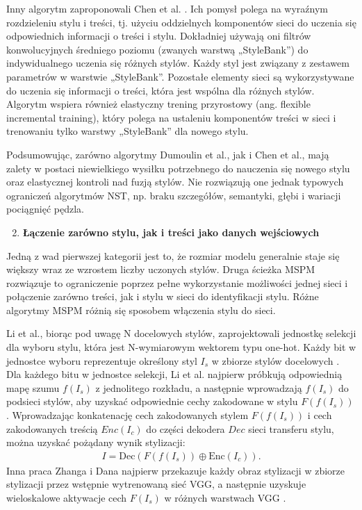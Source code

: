 \documentclass[12pt]{article}
\begin{document}
Inny algorytm zaproponowali Chen et al. \cite{44}. Ich pomysł polega na wyraźnym rozdzieleniu stylu i treści, tj. użyciu oddzielnych komponentów sieci do uczenia się odpowiednich informacji o treści i stylu. Dokładniej używają oni filtrów konwolucyjnych średniego poziomu (zwanych warstwą „StyleBank”) do indywidualnego uczenia się różnych stylów. Każdy styl jest związany z zestawem parametrów w warstwie „StyleBank”. Pozostałe elementy sieci są wykorzystywane do uczenia się informacji o treści, która jest wspólna dla różnych stylów. Algorytm wspiera również elastyczny trening przyrostowy (ang. flexible incremental training), który polega na ustaleniu komponentów treści w sieci i trenowaniu tylko warstwy „StyleBank” dla nowego stylu.

Podsumowując, zarówno algorytmy Dumoulin et al., jak i Chen et al., mają zalety w postaci niewielkiego wysiłku potrzebnego do nauczenia się nowego stylu oraz elastycznej kontroli nad fuzją stylów. Nie rozwiązują one jednak typowych ograniczeń algorytmów NST, np. braku szczegółów, semantyki, głębi i wariacji pociągnięć pędzla.
\begin{enumerate}
    \setcounter{enumi}{1}
    \item \textbf{Łączenie zarówno stylu, jak i treści jako danych wejściowych}
\end{enumerate}

Jedną z wad pierwszej kategorii jest to, że rozmiar modelu generalnie staje się większy wraz ze wzrostem liczby uczonych stylów. Druga ścieżka MSPM rozwiązuje to ograniczenie poprzez pełne wykorzystanie możliwości jednej sieci i połączenie zarówno treści, jak i stylu w sieci do identyfikacji stylu. Różne algorytmy MSPM różnią się sposobem włączenia stylu do sieci.

Li et al., biorąc pod uwagę N docelowych stylów, zaprojektowali jednostkę selekcji dla wyboru stylu, która jest N-wymiarowym wektorem typu one-hot. Każdy bit w jednostce wyboru reprezentuje określony styl $I_s$ w zbiorze stylów docelowych \cite{45}. Dla każdego bitu w jednostce selekcji, Li et al. najpierw próbkują odpowiednią mapę szumu $f(I_s)$ z jednolitego rozkładu, a następnie wprowadzają $f(I_s)$ do podsieci stylów, aby uzyskać odpowiednie cechy zakodowane w stylu $F(f(I_s))$. Wprowadzając konkatenację cech zakodowanych stylem $F(f(I_s))$ i cech zakodowanych treścią $Enc(I_c)$ do części dekodera $Dec$ sieci transferu stylu, można uzyskać pożądany wynik stylizacji:
    \begin{align*}
        I = \text{Dec}\left(F\left(f\left(I_s\right)\right) \oplus \text{Enc}\left(I_c\right)\right).
    \end{align*}
Inna praca Zhanga i Dana najpierw przekazuje każdy obraz stylizacji w zbiorze stylizacji przez wstępnie wytrenowaną sieć VGG, a następnie uzyskuje wieloskalowe aktywacje cech $F(I_s)$ w różnych warstwach VGG \cite{46}.
\end{document}
